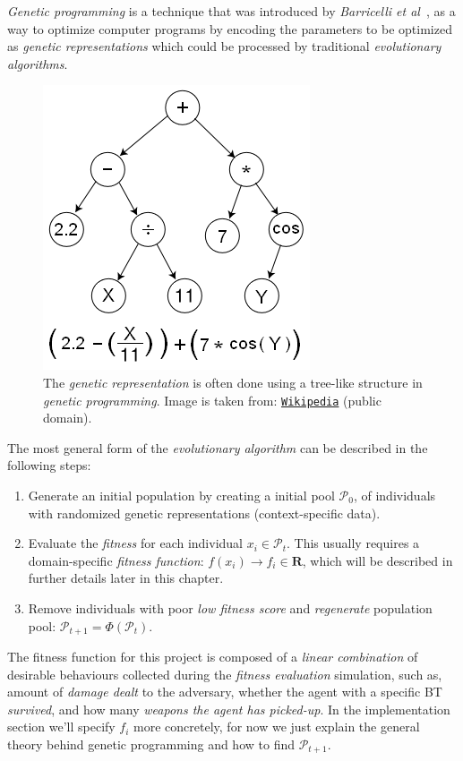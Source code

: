 \documentclass[a4paper, twocolumn]{article}
\begin{document}
	\emph{Genetic programming} is a technique that was introduced by \emph{Barricelli et al}~\cite{barricelli1954esempi}, as a way to optimize computer programs by encoding the parameters to be optimized as \emph{genetic representations} which could be processed by traditional \emph{evolutionary algorithms}.

	\begin{figure}[H]
        \centering
		\includegraphics[width=0.5\linewidth]{share/Genetic_Program_Tree.png}
        \caption{The \emph{genetic representation} is often done using a tree-like structure in \emph{genetic programming}. Image is taken from: \texttt{\href{https://upload.wikimedia.org/wikipedia/commons/7/77/Genetic\_Program\_Tree.png}{Wikipedia}} (public domain).}
		\label{fig:genetic_representation}
	\end{figure}

	The most general form of the \emph{evolutionary algorithm} can be described in the following steps:
    \begin{enumerate}
        \item Generate an initial population by creating a initial pool \(\mathcal{P}_0\), of individuals with randomized genetic representations (context-specific data).
        \item Evaluate the \emph{fitness} for each individual \(x_i \in \mathcal{P}_t\). This usually requires a domain-specific \emph{fitness function}: \(f(x_i)\rightarrow f_i \in \mathbf{R}\), which will be described in further details later in this chapter.
        \item Remove individuals with poor \textit{low fitness score} and \emph{regenerate} population pool: \(\mathcal{P}_{t+1} = \Phi(\mathcal{P}_t)\).
    \end{enumerate}

    The fitness function for this project is composed of a \emph{linear combination} of desirable behaviours collected during the \emph{fitness evaluation} simulation, such as, amount of \emph{damage dealt} to the adversary, whether the agent with a specific BT \emph{survived}, and how many \emph{weapons the agent has picked-up}. In the implementation section we'll specify \(f_i\) more concretely, for now we just explain the general theory behind genetic programming and how to find \(\mathcal{P}_{t+1}\).
\end{document}
